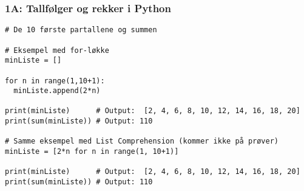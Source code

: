 \greenheader
\begin{frame}[fragile]
\frametitle{1A: Tallfølger og rekker i Python}
\begin{verbatim}
# De 10 første partallene og summen

# Eksempel med for-løkke
minListe = []

for n in range(1,10+1):
  minListe.append(2*n)
  
print(minListe)      # Output:  [2, 4, 6, 8, 10, 12, 14, 16, 18, 20]
print(sum(minListe)) # Output: 110

# Samme eksempel med List Comprehension (kommer ikke på prøver)
minListe = [2*n for n in range(1, 10+1)]   

print(minListe)      # Output:  [2, 4, 6, 8, 10, 12, 14, 16, 18, 20]
print(sum(minListe)) # Output: 110

\end{verbatim}
\end{frame}





